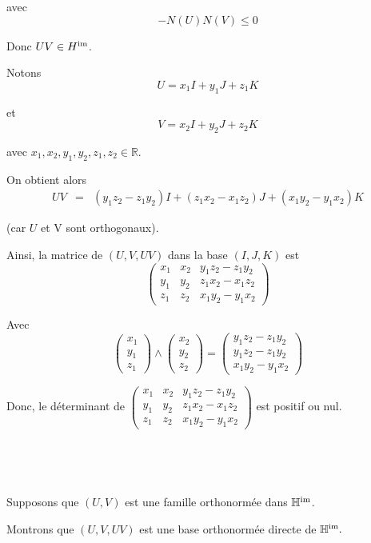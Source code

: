 avec
\[ - N (U) N (V) \leqslant 0 \]


Donc $U V \in H^{\operatorname{im}}$.

Notons
\[ U = x_1 I + y_1 J + z_1 K \]


et
\[ V = x_2 I + y_2 J + z_2 K \]


avec $x_1, x_2, y_1, y_2, z_1, z_2 \in \mathbb{R}$.

On obtient alors
\begin{eqnarray*}
  U V & = & (y_1 z_2 - z_1 y_2) I + (z_1 x_2 - x_1 z_2) J + (x_1 y_2 - y_1
  x_2) K
\end{eqnarray*}


(car $U$ et V sont orthogonaux).

Ainsi, la matrice de $(U, V, U V)$ dans la base $(I, J, K)$ est
\[ \left(\begin{array}{ccc}
     x_1 & x_2 & y_1 z_2 - z_1 y_2\\
     y_1 & y_2 & z_1 x_2 - x_1 z_2\\
     z_1 & z_2 & x_1 y_2 - y_1 x_2
   \end{array}\right) \]


Avec
\[ \left(\begin{array}{c}
     x_1\\
     y_1\\
     z_1
   \end{array}\right) \wedge \left(\begin{array}{c}
     x_2\\
     y_2\\
     z_2
   \end{array}\right) = \left(\begin{array}{c}
     y_1 z_2 - z_1 y_2\\
     y_1 z_2 - z_1 y_2\\
     x_1 y_2 - y_1 x_2
   \end{array}\right) \]


Donc, le d{\'e}terminant de $\left(\begin{array}{ccc}
  x_1 & x_2 & y_1 z_2 - z_1 y_2\\
  y_1 & y_2 & z_1 x_2 - x_1 z_2\\
  z_1 & z_2 & x_1 y_2 - y_1 x_2
\end{array}\right)$ est positif ou nul.

\

\

 Supposons que $(U, V)$ est une famille orthonorm{\'e}e dans
$\mathbb{H}^{\operatorname{im}}$.

Montrons que $(U, V, U V)$ est une base orthonorm{\'e}e directe de
$\mathbb{H}^{\operatorname{im}} .$

